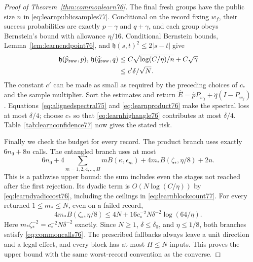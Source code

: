 \begin{proof}[Proof of Theorem~\ref{thm:commonlearn76}]
The final fresh groups have the public size $n$ in
\eqref{eq:learnpublicsamples77}.  Conditional on the record fixing
$w_f$, their success probabilities are exactly
$p-\gamma$ and $q+\gamma$, and each group obeys Bernstein's
bound with allowance $\eta/16$.  Conditional Bernstein bounds,
Lemma~\ref{lem:learnendpoint76}, and
$\mathfrak h(s,t)^2\le2|s-t|$ give
\begin{align}
 \mathfrak h(\widehat p_{\rm raw},p),\,
 \mathfrak h(\widehat q_{\rm raw},q)
 &\le C\sqrt{\log(C/\eta)/n}+C\sqrt\gamma\notag\\
 &\le c'\delta/\sqrt N.
                                      \label{eq:learnhighend76}
\end{align}
The constant $c'$ can be made as small as required by the preceding
choices of $c_*$ and the sample multiplier.  Sort the estimates and
return $\widehat E=\widehat pP_{w_f}+\widehat q(I-P_{w_f})$.
Equations~\eqref{eq:alignedspectral75} and
\eqref{eq:learnproduct76} make the spectral loss at most
$\delta/4$; choose $c_*$ so that
\eqref{eq:learnhighangle76} contributes at most $\delta/4$.
Table~\ref{tab:learnconfidence77} now gives the stated risk.

Finally we check the budget for every record.  The product branch
uses exactly $6n_0+8n$ calls.  The entangled branch uses at most
\begin{equation}\label{eq:learnrecordbudget77}
 6n_0+
 4\sum_{m=1,2,4,\ldots,H}mB(\kappa,\epsilon_m)
 +4m_*B(\zeta_*,\eta/8)+2n.
\end{equation}
This is a pathwise upper bound: the sum includes even the stages
not reached after the first rejection.  Its dyadic term is
$O(N\log(C/\eta))$ by \eqref{eq:learndyadiccost76}, including the
ceilings in \eqref{eq:learnblockcount77}.  For every returned
$1\le m_*\le N$, even on a failed record,
\[
 4m_*B(\zeta_*,\eta/8)
 \le4N+16c_*^{-2}N\delta^{-2}\log(64/\eta).
\]
Here $m_*\zeta_*^{-2}=c_*^{-2}N\delta^{-2}$ exactly.
Since $N\ge1$, $\delta\le\delta_0$, and $\eta\le1/8$, both
branches satisfy \eqref{eq:commoncalls76}.  The prescribed fallbacks
always leave a unit direction and a legal effect, and every block
has at most $H\le N$ inputs.  This proves the upper bound with the
same worst-record convention as the converse.


\end{proof}
